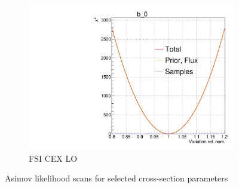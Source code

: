 \begin{figure}[h]
\begin{subfigure}[t]{0.32\textwidth}
		\includegraphics[width=\textwidth,page=104, trim={0mm 0mm 0mm 9mm}, clip]{figures/mach3/2018/llh/tryBinningNumber6_after_fit_asimov_asimov_ND280logL_scan}
		\caption{FSI CEX LO}
	\end{subfigure}
	\caption{Asimov likelihood scans for selected cross-section parameters}
	\label{fig:xsec_asimov_llh_2018}
\end{figure}

